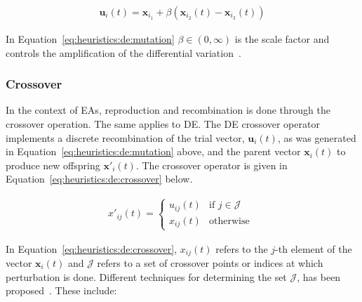 \begin{equation}
      \label{eq:heuristics:de:mutation}
      \begin{split}
            \boldsymbol{u}_{i}(t) = \boldsymbol{x}_{i_{1}} + \beta(\boldsymbol{x}_{i_{2}}(t) - \boldsymbol{x}_{i_{3}}(t))
      \end{split}
\end{equation}

In Equation~\eqref{eq:heuristics:de:mutation} $\beta \in (0, \infty)$ is the scale factor and controls the amplification of the differential variation~\cite{ref:engelbrecht:2007}.


\subsubsection{Crossover}\label{sec:heuristics:mh:de:crossover}

In the context of \acp{EA}, reproduction and recombination is done through the crossover operation. The same applies to \acs{DE}. The \acs{DE} crossover operator implements a discrete recombination of the trial vector, $\boldsymbol{u}_{i}(t)$, as was generated in Equation~\eqref{eq:heuristics:de:mutation} above, and the parent vector $\boldsymbol{x}_{i}(t)$ to produce new offspring $\boldsymbol{x}'_{i}(t)$. The crossover operator is given in Equation~\eqref{eq:heuristics:de:crossover} below.

\begin{equation}
      \label{eq:heuristics:de:crossover}
      \begin{split}
            x'_{ij}(t)=
            \begin{cases}
                  u_{ij}(t) & \text{if } j \in \mathcal{J} \\
                  x_{ij}(t) & \text{otherwise }
            \end{cases}
      \end{split}
\end{equation}

In Equation~\eqref{eq:heuristics:de:crossover}, $x_{ij}(t)$ refers to the $j$-th element of the vector $\boldsymbol{x}_{i}(t)$ and $\mathcal{J}$ refers to a set of crossover points or indices at which perturbation is done. Different techniques for determining the set $\mathcal{J}$, has been proposed~\cite{ref:storn:1996, ref:storn:1997}. These include:

